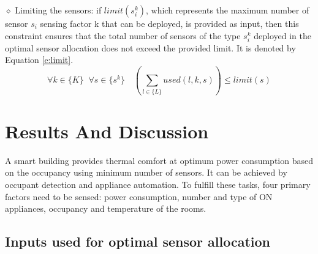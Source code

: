 \documentclass[]{interact}
\theoremstyle{plain}%
\theoremstyle{definition}
\theoremstyle{remark}
\begin{document}
  \noindent $\diamond$ Limiting the sensors: if $limit(s_i^k)$, which represents the maximum number of sensor $s_i$ sensing factor k that can be deployed, is provided as input, then this constraint ensures that the total number of sensors of the type $s_i^k$ deployed in the optimal sensor allocation does not exceed the provided limit.
  It is denoted by Equation \eqref{e:limit}.
\begin{equation}
  \label{e:limit}
    \forall k \in \{K\} \;\; \forall s \in \{s^k\} \quad \left(
      \sum_{l \in \{L\}} used(l,k,s)
    \right) \leq limit(s)
   \end{equation}


\section{Results And Discussion}

A smart building provides thermal comfort at optimum power consumption based on the occupancy using minimum number of sensors. It can be achieved by occupant detection and appliance automation. To fulfill these tasks, four primary factors need to be sensed: power consumption, number and type of ON appliances, occupancy and temperature of the rooms.

\subsection{Inputs used for optimal sensor allocation}
\end{document}
